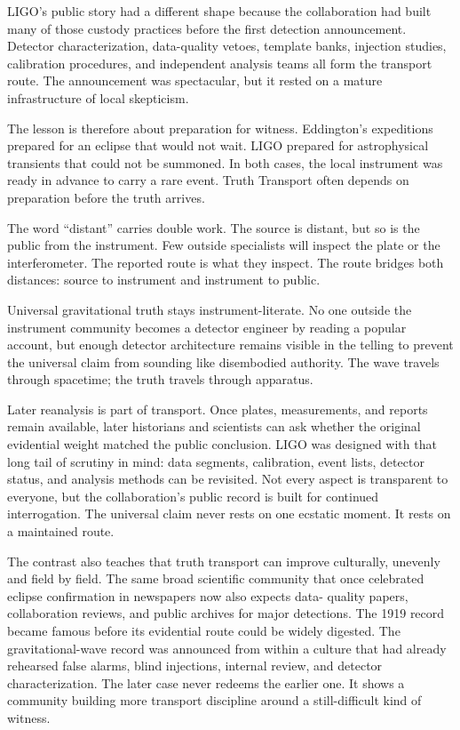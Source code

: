 LIGO's public story had a different shape because the collaboration had
built many of those custody practices before the first detection
announcement. Detector characterization, data-quality vetoes, template
banks, injection studies, calibration procedures, and independent
analysis teams all form the transport route. The announcement was
spectacular, but it rested on a mature infrastructure of local
skepticism.

The lesson is therefore about preparation for witness. Eddington's
expeditions prepared for an eclipse that would not wait. LIGO prepared
for astrophysical transients that could not be summoned. In both cases,
the local instrument was ready in advance to carry a rare event. Truth
Transport often depends on preparation before the truth arrives.

The word ``distant'' carries double work. The source is distant, but so
is the public from the instrument. Few outside specialists will inspect
the plate or the interferometer. The reported route is what they inspect.
The route bridges both distances: source to instrument and instrument to
public.

Universal gravitational truth stays instrument-literate. No one outside
the instrument community becomes a detector engineer by reading a
popular account, but enough detector architecture remains visible in the
telling to prevent the universal claim from sounding like disembodied
authority. The wave travels through spacetime; the truth travels through
apparatus.

Later reanalysis is part of transport. Once plates, measurements, and
reports remain available, later historians and scientists can ask whether
the original evidential weight matched the public conclusion. LIGO was
designed with that long tail of scrutiny in mind: data segments,
calibration, event lists, detector status, and analysis methods can be
revisited. Not every aspect is transparent to everyone, but the
collaboration's public record is built for continued interrogation. The
universal claim never rests on one ecstatic moment. It rests on a
maintained route.

The contrast also teaches that truth transport can improve culturally,
unevenly and field by field. The same broad scientific community that once
celebrated eclipse confirmation in newspapers now also expects data-
quality papers, collaboration reviews, and public archives for major
detections. The 1919 record became famous before its evidential route
could be widely digested. The gravitational-wave record was announced
from within a culture that had already rehearsed false alarms, blind
injections, internal review, and detector characterization. The later
case never redeems the earlier one. It shows a community building more
transport discipline around a still-difficult kind of witness.

